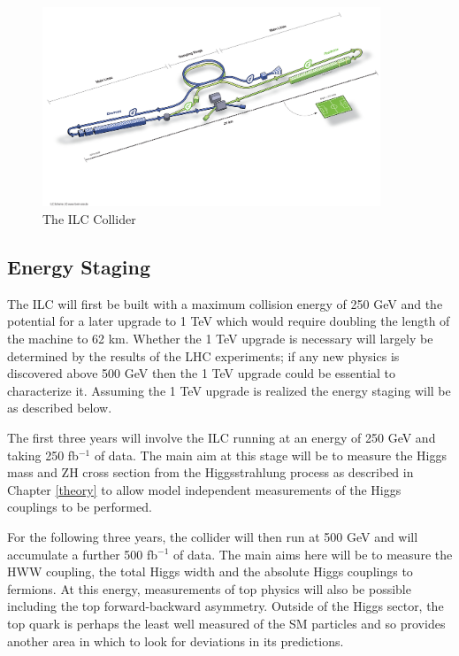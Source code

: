 \begin{figure}
  \centering
  \includegraphics[width=0.9\textwidth,keepaspectratio]{Experiments/fig/ILC}
  \caption[The ILC Experiment]{The \ac{ILC} Collider\cite{ILCTDR}}
  \label{Fig:ILC}
\end{figure}

\subsection{Energy Staging}

The \ac{ILC} will first be built with a maximum collision energy of 250 GeV and the potential for a later upgrade to 1 TeV which would require doubling the length of the machine to 62 km. Whether the 1 TeV upgrade is necessary will largely be determined by the results of the \ac{LHC} experiments; if any new physics is discovered above 500 GeV then the 1 TeV upgrade could be essential to characterize it. Assuming the 1 TeV upgrade is realized the energy staging will be as described below.

The first three years will involve the ILC running at an energy of 250 GeV and taking 250 fb${^{-1}}$ of data. The main aim at this stage will be to measure the Higgs mass and ZH cross section from the Higgsstrahlung process as described in Chapter \ref{theory} to allow model independent measurements of the Higgs couplings to be performed.

For the following three years, the collider will then run at 500 GeV and will accumulate a further 500 fb${^{-1}}$ of data. The main aims here will be to measure the HWW coupling, the total Higgs width and the absolute Higgs couplings to fermions. At this energy, measurements of top physics will also be possible including the top forward-backward asymmetry. Outside of the Higgs sector, the top quark is perhaps the least well measured of the \ac{SM} particles and so provides another area in which to look for deviations in its predictions.

